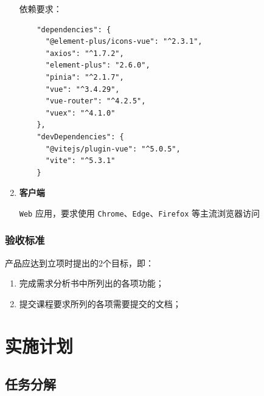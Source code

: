 \documentclass[12pt,a4paper,UTF8]{article}
\begin{document}
\begin{enumerate}
  依赖要求：

  \vspace{0.25cm} %

  \begin{lstlisting}
    "dependencies": {
      "@element-plus/icons-vue": "^2.3.1",
      "axios": "^1.7.2",
      "element-plus": "2.6.0",
      "pinia": "^2.1.7",
      "vue": "^3.4.29",
      "vue-router": "^4.2.5",
      "vuex": "^4.1.0"
    },
    "devDependencies": {
      "@vitejs/plugin-vue": "^5.0.5",
      "vite": "^5.3.1"
    }
  \end{lstlisting}
  \item \textbf{客户端}
  
  \verb|Web| 应用，要求使用 \verb|Chrome|、\verb|Edge|、\verb|Firefox| 等主流浏览器访问
\end{enumerate}

\subsubsection{验收标准}

产品应达到立项时提出的2个目标，即：
\begin{enumerate}
  \item 完成需求分析书中所列出的各项功能；
  \item 提交课程要求所列的各项需要提交的文档；
\end{enumerate}

\section{实施计划}

\subsection{任务分解}
\end{document}
